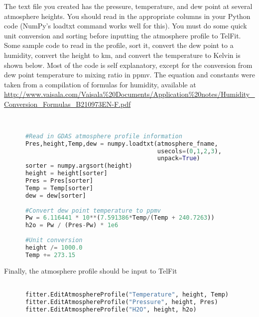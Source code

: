 \documentclass{article}
\begin{document}
The text file you created has the pressure, temperature, and dew point at several atmosphere heights. You should read in the appropriate columns in your Python code (NumPy's loadtxt command works well for this). You must do some quick unit conversion and sorting before inputting the atmosphere profile to TelFit. Some sample code to read in the profile, sort it, convert the dew point to a humidity, convert the height to km, and convert the temperature to Kelvin is shown below. Most of the code is self explanatory, except for the conversion from dew point temperature to mixing ratio in ppmv. The equation and constants were taken from a compilation of formulas for humidity, available at \url{http://www.vaisala.com/Vaisala%20Documents/Application%20notes/Humidity_Conversion_Formulas_B210973EN-F.pdf}





\begin{lstlisting}[language=Python, caption={Code to adjust units from GDAS archive}]


      #Read in GDAS atmosphere profile information
      Pres,height,Temp,dew = numpy.loadtxt(atmosphere_fname,
                                           usecols=(0,1,2,3), 
                                           unpack=True)
      sorter = numpy.argsort(height)
      height = height[sorter]
      Pres = Pres[sorter]
      Temp = Temp[sorter]
      dew = dew[sorter]
      
      #Convert dew point temperature to ppmv
      Pw = 6.116441 * 10**(7.591386*Temp/(Temp + 240.7263))
      h2o = Pw / (Pres-Pw) * 1e6
      
      #Unit conversion
      height /= 1000.0
      Temp += 273.15


\end{lstlisting}

Finally, the atmosphere profile should be input to TelFit

\begin{lstlisting}[language=Python]

      fitter.EditAtmosphereProfile("Temperature", height, Temp)
      fitter.EditAtmosphereProfile("Pressure", height, Pres)
      fitter.EditAtmosphereProfile("H2O", height, h2o)
\end{lstlisting}




%
\end{document}
